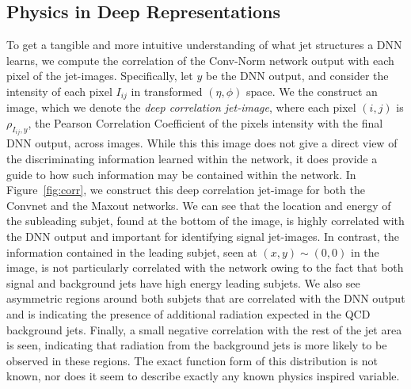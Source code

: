 \clearpage
\newpage

\subsection{Physics in Deep Representations} %
\label{ssub:physics_in_deep_representations}
To get a tangible and more intuitive understanding of what jet structures a DNN learns, we compute the correlation of the Conv-Norm network output with each pixel of the jet-images. Specifically, let $y$ be the DNN output, and consider the intensity of each pixel $I_{ij}$ in transformed $(\eta, \phi)$ space. We the construct an image, which we denote the \emph{deep correlation jet-image}, where each pixel $(i, j)$ is $\rho_{I_{ij}, y}$, the Pearson Correlation Coefficient of the pixels intensity with the final DNN output, across images. While this this image does not give a direct view of the discriminating information learned within the network, it does provide a guide to how such information may be contained within the network.  In Figure~\ref{fig:corr}, we construct this deep correlation jet-image for both the Convnet and the Maxout networks.  We can see that the location and energy of the subleading subjet, found at the bottom of the image, is highly correlated with the DNN output and important for identifying signal jet-images.  In contrast, the information contained in the leading subjet, seen at $(x,y)\sim (0,0)$ in the image, is not particularly correlated with the network owing to the fact that both signal and background jets have high energy leading subjets.  We also see asymmetric regions around both subjets that are correlated with the DNN output and is indicating the presence of additional radiation expected in the QCD background jets.  Finally, a small negative correlation with the rest of the jet area is seen, indicating that radiation from the background jets is more likely to be observed in these regions.   The exact function form of this distribution is not known, nor does it seem to describe exactly any known physics inspired variable.

